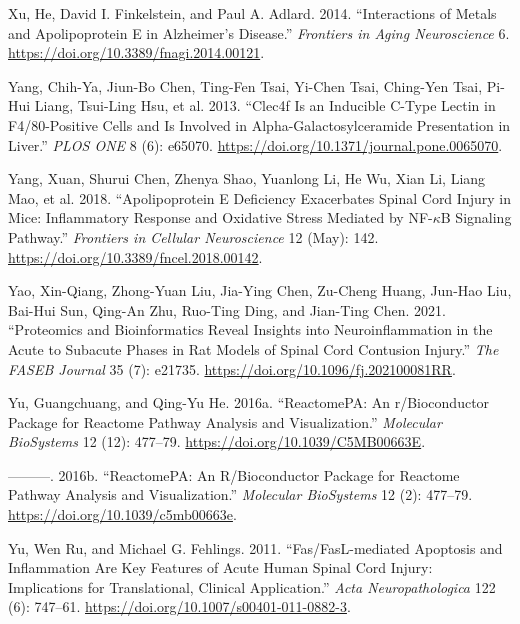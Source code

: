 \documentclass[9pt,lineno]{elife}
\newlength{\cslhangindent}
\newlength{\cslentryspacingunit} %
\newenvironment{CSLReferences}[2] %
 {%
  \setlength{\parindent}{0pt}
  \ifodd #1
  \let\oldpar\par
  \def\par{\hangindent=\cslhangindent\oldpar}
  \fi
  \setlength{\parskip}{#2\cslentryspacingunit}
 }%
 {}
\begin{document}
\begin{CSLReferences}{1}{0}
\leavevmode{}%
Xu, He, David I. Finkelstein, and Paul A. Adlard. 2014. {``Interactions of Metals and {Apolipoprotein E} in {Alzheimer}'s Disease.''} \emph{Frontiers in Aging Neuroscience} 6. \url{https://doi.org/10.3389/fnagi.2014.00121}.

\leavevmode{}%
Yang, Chih-Ya, Jiun-Bo Chen, Ting-Fen Tsai, Yi-Chen Tsai, Ching-Yen Tsai, Pi-Hui Liang, Tsui-Ling Hsu, et al. 2013. {``{Clec4f Is} an {Inducible C-Type Lectin} in {F4}/80-{Positive Cells} and {Is Involved} in {Alpha-Galactosylceramide Presentation} in {Liver}.''} \emph{PLOS ONE} 8 (6): e65070. \url{https://doi.org/10.1371/journal.pone.0065070}.

\leavevmode{}%
Yang, Xuan, Shurui Chen, Zhenya Shao, Yuanlong Li, He Wu, Xian Li, Liang Mao, et al. 2018. {``Apolipoprotein {E Deficiency Exacerbates Spinal Cord Injury} in {Mice}: {Inflammatory Response} and {Oxidative Stress Mediated} by {NF-\(\kappa\)B Signaling Pathway}.''} \emph{Frontiers in Cellular Neuroscience} 12 (May): 142. \url{https://doi.org/10.3389/fncel.2018.00142}.

\leavevmode{}%
Yao, Xin-Qiang, Zhong-Yuan Liu, Jia-Ying Chen, Zu-Cheng Huang, Jun-Hao Liu, Bai-Hui Sun, Qing-An Zhu, Ruo-Ting Ding, and Jian-Ting Chen. 2021. {``Proteomics and Bioinformatics Reveal Insights into Neuroinflammation in the Acute to Subacute Phases in Rat Models of Spinal Cord Contusion Injury.''} \emph{The FASEB Journal} 35 (7): e21735. \url{https://doi.org/10.1096/fj.202100081RR}.

\leavevmode{}%
Yu, Guangchuang, and Qing-Yu He. 2016a. {``ReactomePA: An r/Bioconductor Package for Reactome Pathway Analysis and Visualization.''} \emph{Molecular BioSystems} 12 (12): 477--79. \url{https://doi.org/10.1039/C5MB00663E}.

\leavevmode{}%
---------. 2016b. {``{ReactomePA}: An {R}/{Bioconductor} Package for Reactome Pathway Analysis and Visualization.''} \emph{Molecular BioSystems} 12 (2): 477--79. \url{https://doi.org/10.1039/c5mb00663e}.

\leavevmode{}%
Yu, Wen Ru, and Michael G. Fehlings. 2011. {``Fas/{FasL-mediated} Apoptosis and Inflammation Are Key Features of Acute Human Spinal Cord Injury: Implications for Translational, Clinical Application.''} \emph{Acta Neuropathologica} 122 (6): 747--61. \url{https://doi.org/10.1007/s00401-011-0882-3}.


\end{CSLReferences}
\end{document}
